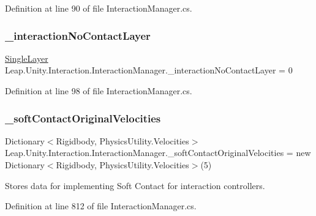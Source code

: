 Definition at line 90 of file Interaction\+Manager.\+cs.

\mbox{\label{class_leap_1_1_unity_1_1_interaction_1_1_interaction_manager_a19f2155251076eb53a9083f8f5be2de4}} 
\subsubsection{\texorpdfstring{\_interactionNoContactLayer}{\_interactionNoContactLayer}}
{\footnotesize\ttfamily \mbox{\hyperlink{struct_leap_1_1_unity_1_1_single_layer}{Single\+Layer}} Leap.\+Unity.\+Interaction.\+Interaction\+Manager.\+\_\+interaction\+No\+Contact\+Layer = 0\hspace{0.3cm}{\ttfamily [protected]}}



Definition at line 98 of file Interaction\+Manager.\+cs.

\mbox{\label{class_leap_1_1_unity_1_1_interaction_1_1_interaction_manager_a049c0b24c30386942bb3abe7d3118b6e}} 
\subsubsection{\texorpdfstring{\_softContactOriginalVelocities}{\_softContactOriginalVelocities}}
{\footnotesize\ttfamily Dictionary$<$Rigidbody, Physics\+Utility.\+Velocities$>$ Leap.\+Unity.\+Interaction.\+Interaction\+Manager.\+\_\+soft\+Contact\+Original\+Velocities = new Dictionary$<$Rigidbody, Physics\+Utility.\+Velocities$>$(5)}



Stores data for implementing Soft Contact for interaction controllers. 



Definition at line 812 of file Interaction\+Manager.\+cs.

